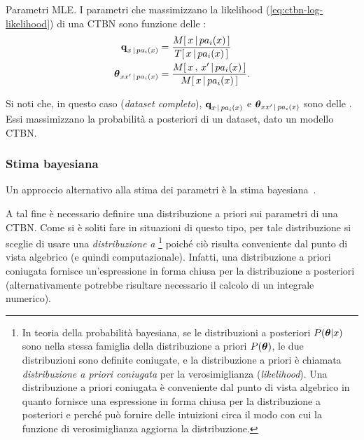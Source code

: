 \begin{teorema}{Parametri \ac{MLE}.}
I parametri che massimizzano la likelihood (\autoref{eq:ctbn-log-likelihood}) di una \acl{CTBN} sono funzione delle \stats{}:
\begin{equation}
\label{eq:ctbn-params}\normalfont
\begin{split}
\param{q}_{\setel{x}\,\arrowvert\,pa_i(\setel{x})}&=\frac{\mstat{x\,\arrowvert\,pa_i(\setel{x})}}{\tstat{\setel{x}\,\arrowvert\,pa_i(\setel{x})}} \\
\param{$\theta$}_{\setel{x}\setel{x}^\prime\,\arrowvert\,pa_i(\setel{x})}&=\frac{\mstat[x]{\setel{x}^\prime\,\arrowvert\,pa_i(\setel{x})}}{\mstat{\setel{x}\,\arrowvert\,pa_i(\setel{x})}}\text{.}
\end{split}
\end{equation}
\end{teorema}
\normalfont
Si noti che, in questo caso (\emph{dataset completo}), $\boldsymbol{\textbf{\text{q}}}_{\mathnormal{x}\,\arrowvert\,pa_i(\mathnormal{x})}$ e $\boldsymbol{\textbf{\text{$\theta$}}}_{\mathnormal{x}\mathnormal{x}^\prime\,\arrowvert\,pa_i(\mathnormal{x})}$ sono delle \emph{}. Essi massimizzano la probabilità a posteriori di un dataset, dato un modello \acs{CTBN}.

\subsubsection{Stima bayesiana}
\label{sec:ctbn-bayesian-estimate}
Un approccio alternativo alla stima dei parametri è la stima bayesiana~\citep[si veda][sezione 5.1.1]{Nodelman2007}.

A tal fine è necessario definire una distribuzione a priori sui parametri di una \acs{CTBN}. Come si è soliti fare in situazioni di questo tipo, per tale distribuzione si sceglie di usare una \emph{distribuzione a }\footnote{\label{note:conjugate-prior}In teoria della probabilità bayesiana, se le distribuzioni a posteriori $P(\boldsymbol{\textbf{\text{$\theta$}}}|\mathnormal{x})$ sono nella stessa famiglia della distribuzione a priori $P(\boldsymbol{\textbf{\text{$\theta$}}})$, le due distribuzioni sono definite coniugate, e la distribuzione a priori è chiamata \emph{distribuzione a priori coniugata} per la verosimiglianza (\emph{likelihood}). Una distribuzione a priori coniugata è conveniente dal punto di vista algebrico in quanto fornisce una espressione in forma chiusa per la distribuzione a posteriori e perché può fornire delle intuizioni circa il modo con cui la funzione di verosimiglianza aggiorna la distribuzione.} poiché ciò risulta conveniente dal punto di vista algebrico (e quindi computazionale). Infatti, una distribuzione a priori coniugata fornisce un'espressione in forma chiusa per la distribuzione a posteriori (alternativamente potrebbe risultare necessario il calcolo di un integrale numerico).


